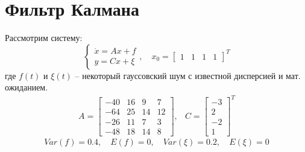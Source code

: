 \section{Фильтр Калмана}
Рассмотрим систему: 
\begin{equation}
    \begin{cases}
        \dot{x} = Ax + f \\ 
        y = Cx + \xi
    \end{cases}, \quad x_0 = \begin{bmatrix}1 & 1 & 1 & 1\end{bmatrix}^T
\end{equation}
где $f(t)$ и $\xi(t)$ -- некоторый гауссовский шум с известной дисперсией и мат. ожиданием. 
\begin{equation}
    \begin{array}{ccc}
        A = \begin{bmatrix}
            -40 & 16 & 9 & 7 \\ 
            -64 & 25 & 14 & 12 \\ 
            -26 & 11 & 7 & 3 \\ 
            -48 & 18 & 14 & 8
        \end{bmatrix}, & 
        C = \begin{bmatrix}
            -3 \\ 2 \\ -2 \\ 1
        \end{bmatrix}^T
    \end{array}
\end{equation}
\begin{equation}
    Var(f) = 0.4,  \quad E(f) = 0, \quad Var(\xi) = 0.2,  \quad  E(\xi) = 0
\end{equation}

